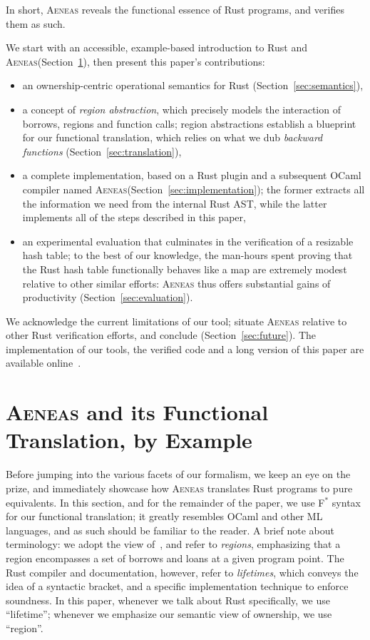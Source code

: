 \documentclass[acmsmall,screen]{acmart}
\newcommand{\sref}[1]{Section~\ref{sec:#1}}
\newcommand{\aeneas}{\textsc{Aeneas}\xspace}
\newcommand{\fstar}{F$^\ast$\xspace}
\begin{document}
In short, \aeneas reveals the
functional essence of Rust programs, and verifies them as such.

We start with an accessible, example-based introduction to
Rust and \aeneas (\sref{examples}), then present this paper's contributions:
\begin{itemize}
  \item an ownership-centric operational semantics for Rust (\sref{semantics}),
  \item a concept of \emph{region abstraction},
    which precisely models the
    interaction of borrows, regions and function calls; region abstractions establish
    a blueprint for our functional translation, which relies on what we dub
    \emph{backward functions} (\sref{translation}),
  \item a complete implementation, based on a Rust plugin and a subsequent OCaml
    compiler named \aeneas (\sref{implementation});
    the former extracts all the information we need from the internal Rust AST,
    while the latter implements all of the steps described in this paper,
  \item an experimental evaluation that culminates in the verification of a
    resizable hash table; to the best of our knowledge, the man-hours spent
    proving that the Rust hash table functionally behaves like a map are
    extremely modest
    relative to other
    similar efforts: \aeneas thus offers substantial gains of productivity (\sref{evaluation}).
\end{itemize}
We acknowledge the current limitations of our tool; situate \aeneas relative to
other Rust verification efforts, and conclude (\sref{future}). The
implementation of our tools, the verified code and a long version of this paper
are available online~\cite{aeneas-website,longversion,artifact}.









\section{\aeneas and its Functional Translation, by Example}
\label{sec:examples}

Before jumping into the various facets of our formalism, we keep an eye on the
prize, and immediately showcase how \aeneas translates Rust programs to pure
equivalents. In this section, and for the remainder of the paper, we use
\fstar syntax for our functional translation; it greatly resembles OCaml and
other ML languages, and as such should be familiar to the reader. A brief note
about terminology: we adopt the view of~\citet{niko-regions}, and refer to
\emph{regions}, emphasizing that a region encompasses a set of borrows and
loans at a given program point. The Rust compiler and documentation, however,
refer to \emph{lifetimes}, which conveys the idea of a syntactic bracket, and
a specific implementation technique to enforce soundness. In this paper,
whenever we talk about Rust specifically, we use ``lifetime''; whenever we emphasize
our semantic view of ownership, we use ``region''.
\end{document}
